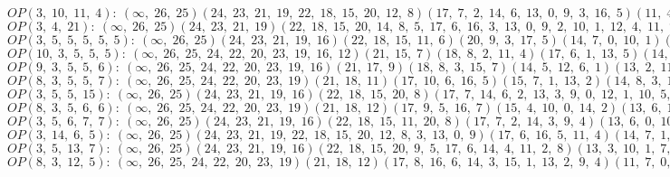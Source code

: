 $OP(3, \;10, \;11, \;4): \:(\infty, \;26, \;25)(24, \;23, \;21, \;19, \;22, \;18, \;15, \;20, \;12, \;8)(17, \;7, \;2, \;14, \;6, \;13, \;0, \;9, \;3, \;16, \;5)(11, \;4, \;10, \;1)$\\
$OP(3, \;4, \;21): \:(\infty, \;26, \;25)(24, \;23, \;21, \;19)(22, \;18, \;15, \;20, \;14, \;8, \;5, \;17, \;6, \;16, \;3, \;13, \;0, \;9, \;2, \;10, \;1, \;12, \;4, \;11, \;7)$\\
$OP(3, \;5, \;5, \;5, \;5, \;5): \:(\infty, \;26, \;25)(24, \;23, \;21, \;19, \;16)(22, \;18, \;15, \;11, \;6)(20, \;9, \;3, \;17, \;5)(14, \;7, \;0, \;10, \;1)(13, \;8, \;2, \;12, \;4)$\\
$OP(10, \;3, \;5, \;5, \;5): \:(\infty, \;26, \;25, \;24, \;22, \;20, \;23, \;19, \;16, \;12)(21, \;15, \;7)(18, \;8, \;2, \;11, \;4)(17, \;6, \;1, \;13, \;5)(14, \;9, \;0, \;10, \;3)$\\
$OP(9, \;3, \;5, \;5, \;6): \:(\infty, \;26, \;25, \;24, \;22, \;20, \;23, \;19, \;16)(21, \;17, \;9)(18, \;8, \;3, \;15, \;7)(14, \;5, \;12, \;6, \;1)(13, \;2, \;11, \;4, \;10, \;0)$\\
$OP(8, \;3, \;5, \;5, \;7): \:(\infty, \;26, \;25, \;24, \;22, \;20, \;23, \;19)(21, \;18, \;11)(17, \;10, \;6, \;16, \;5)(15, \;7, \;1, \;13, \;2)(14, \;8, \;3, \;12, \;4, \;9, \;0)$\\
$OP(3, \;5, \;5, \;15): \:(\infty, \;26, \;25)(24, \;23, \;21, \;19, \;16)(22, \;18, \;15, \;20, \;8)(17, \;7, \;14, \;6, \;2, \;13, \;3, \;9, \;0, \;12, \;1, \;10, \;5, \;11, \;4)$\\
$OP(8, \;3, \;5, \;6, \;6): \:(\infty, \;26, \;25, \;24, \;22, \;20, \;23, \;19)(21, \;18, \;12)(17, \;9, \;5, \;16, \;7)(15, \;4, \;10, \;0, \;14, \;2)(13, \;6, \;11, \;3, \;8, \;1)$\\
$OP(3, \;5, \;6, \;7, \;7): \:(\infty, \;26, \;25)(24, \;23, \;21, \;19, \;16)(22, \;18, \;15, \;11, \;20, \;8)(17, \;7, \;2, \;14, \;3, \;9, \;4)(13, \;6, \;0, \;10, \;1, \;12, \;5)$\\
$OP(3, \;14, \;6, \;5): \:(\infty, \;26, \;25)(24, \;23, \;21, \;19, \;22, \;18, \;15, \;20, \;12, \;8, \;3, \;13, \;0, \;9)(17, \;6, \;16, \;5, \;11, \;4)(14, \;7, \;1, \;10, \;2)$\\
$OP(3, \;5, \;13, \;7): \:(\infty, \;26, \;25)(24, \;23, \;21, \;19, \;16)(22, \;18, \;15, \;20, \;9, \;5, \;17, \;6, \;14, \;4, \;11, \;2, \;8)(13, \;3, \;10, \;1, \;7, \;12, \;0)$\\
$OP(8, \;3, \;12, \;5): \:(\infty, \;26, \;25, \;24, \;22, \;20, \;23, \;19)(21, \;18, \;12)(17, \;8, \;16, \;6, \;14, \;3, \;15, \;1, \;13, \;2, \;9, \;4)(11, \;7, \;0, \;10, \;5)$\\
